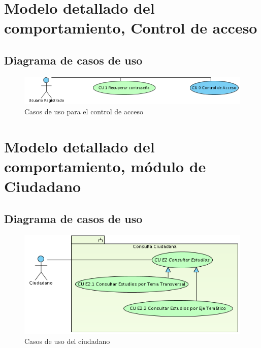 \documentclass[10pt]{book}
\begin{document}
\chapter{Modelo detallado del comportamiento, Control de acceso} 

\section{Diagrama de casos de uso}

\begin{figure}[htbp!]
	\begin{center}
		\includegraphics[width=.3\textwidth]{images/CUcontrolAcceso}
		\caption{Casos de uso para el control de acceso}
		\label{fig:default}
	\end{center}
\end{figure}


\chapter{Modelo detallado del comportamiento, módulo de Ciudadano} 

\section{Diagrama de casos de uso}

\begin{figure}[htbp!]
	\begin{center}
		\includegraphics[width=.5\textwidth]{images/CUciudadano}
		\caption{Casos de uso del ciudadano}
		\label{fig:default}
	\end{center}
\end{figure}

\end{document}
